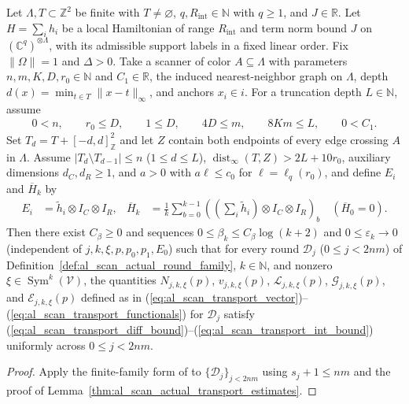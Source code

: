 \begin{lemma}
    Let $\Lambda,T\subset\mathbb Z^2$ be finite with $T\ne\varnothing$,
    $q,R_{\mathrm{int}}\in\mathbb N$ with $q\ge1$, and $J\in\mathbb R$.
    Let $H=\sum_i h_i$ be a local Hamiltonian of range
    $R_{\mathrm{int}}$ and term norm bound $J$ on
    $(\mathbb C^q)^{\otimes\Lambda}$, with its admissible support labels
    in a fixed linear order. Fix $\|\Omega\|=1$ and $\Delta>0$.
    Take a scanner of color $A\subseteq\Lambda$ with parameters
    $n,m,K,D,r_0\in\mathbb N$ and $C_1\in\mathbb R$, the induced
    nearest-neighbor graph on $\Lambda$, depth
    $d(x)=\min_{t\in T}\|x-t\|_\infty$, and anchors $x_i\in i$.
    For a truncation depth $L\in\mathbb N$, assume
    \begin{align}
        0<n,\qquad r_0\le D,\qquad 1\le D,
        \qquad 4D\le m,\qquad 8Km\le L,\qquad 0<C_1.
        \label{eq:al_scan_family_scales}
    \end{align}
    Set $T_d=T+[-d,d]^2_{\mathbb Z}$ and let $Z$ contain both endpoints
    of every edge crossing $A$ in $\Lambda$. Assume
    $|T_d\setminus T_{d-1}|\le n$ ($1\le d\le L$),
    $\operatorname{dist}_\infty(T,Z)>2L+10r_0$, auxiliary dimensions
    $d_C,d_R\ge1$, and $a>0$ with $a\ell\le c_0$
    for $\ell=\ell_q(r_0)$, and define $E_i$ and $\overline H_k$ by
    \begin{align}
        E_i           & =\widetilde h_i\otimes I_C\otimes I_R, &
        \overline H_k & =\frac1k\sum_{b=0}^{k-1}
        \left(\left(\sum_i\widetilde h_i\right)\otimes I_C\otimes I_R\right)_b
        \quad(\overline H_0=0).
        \label{eq:al_scan_family_energy}
    \end{align}
    Then there exist $C_\beta\ge0$ and sequences $0\le\beta_k\le C_\beta\log(k+2)$
    and $0\le\varepsilon_k\to0$ (independent of $j,k,\xi,p,p_0,p_1,E_0$) such
    that for every round $\mathscr D_j$ ($0\le j<2nm$) of
    Definition~\ref{def:al_scan_actual_round_family}, $k\in\mathbb N$, and
    nonzero $\xi\in\operatorname{Sym}^k(\mathcal V)$, the quantities
    $N_{j,k,\xi}(p)$, $v_{j,k,\xi}(p)$, $\mathcal L_{j,k,\xi}(p)$,
    $\mathcal G_{j,k,\xi}(p)$, and $\mathcal E_{j,k,\xi}(p)$ defined as in
    (\ref{eq:al_scan_transport_vector})--(\ref{eq:al_scan_transport_functionals})
    for $\mathscr D_j$ satisfy
    (\ref{eq:al_scan_transport_diff_bound})--(\ref{eq:al_scan_transport_int_bound})
    uniformly across $0\le j<2nm$.
\end{lemma}
\begin{proof}\leanok
    Apply the finite-family form of \cite[Proposition~7.4]{OpenAI2026AreaLaw}
    to $\{\mathscr D_j\}_{j<2nm}$ using $s_j+1\le nm$ and the proof of
    Lemma~\ref{thm:al_scan_actual_transport_estimates}.
\end{proof}

